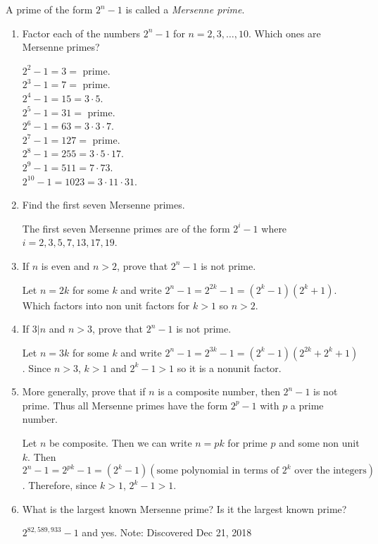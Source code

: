 \documentclass[a4paper, 11pt]{article}
\begin{document}
    A prime of the form $2^n-1$ is called a \textit{Mersenne prime}.
    \begin{enumerate}[label=(\alph*)]
        \item Factor each of the numbers $2^n-1$ for $n=2,3,\dots,10$. Which ones are Mersenne primes?
        
        $2^2-1 = 3 =$ prime.\\
        $2^3-1 = 7 =$ prime.\\
        $2^4-1 = 15 = 3\cdot 5$.\\
        $2^5-1 = 31 =$ prime.\\
        $2^6-1 = 63 = 3\cdot 3\cdot 7$.\\
        $2^7-1 = 127 =$ prime.\\
        $2^8-1 = 255 = 3\cdot 5\cdot 17$.\\
        $2^9-1 = 511 = 7\cdot 73$.\\
        $2^{10}-1 = 1023 = 3\cdot 11\cdot 31$.
        
        \item Find the first seven Mersenne primes.
        
        The first seven Mersenne primes are of the form $2^i-1$ where $i=2, 3, 5, 7, 13, 17, 19$.
        \item If $n$ is even and $n>2$, prove that $2^n-1$ is not prime.
        
        Let $n = 2k$ for some $k$ and write $2^n-1=2^{2k}-1=(2^k-1)(2^k+1)$. Which factors into non unit factors for $k>1$ so $n>2$.
        \item If $3\vert n$ and $n>3$, prove that $2^n-1$ is not prime.
        
        Let $n = 3k$ for some $k$ and write $2^n-1 = 2^{3k}-1 =  (2^k - 1)(2^{2k} + 2^k + 1)$. Since $n>3$, $k>1$ and $2^k-1 > 1$ so it is a nonunit factor.
        \item More generally, prove that if $n$ is a composite number, then $2^n-1$ is not prime. Thus all Mersenne primes have the form $2^p-1$ with $p$ a prime number.
        
        Let $n$ be composite. Then we can write $n=pk$ for prime $p$ and some non unit $k$. Then $2^n-1 = 2^{pk} - 1 = (2^k - 1)(\text{some polynomial in terms of }2^k \text{ over the integers})$. Therefore, since $k>1$, $2^k-1 > 1$.
        \item What is the largest known Mersenne prime? Is it the largest known prime?
        
        $2^{82,589,933}-1$ and yes. Note: Discovered Dec 21, 2018
    \end{enumerate}
    
\end{document}
